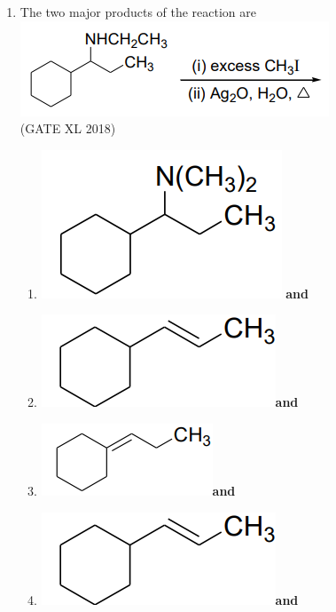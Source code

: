 \documentclass[14pt]{extarticle}
\begin{document}
\begin{flushleft}
\begin{enumerate}
\begin{enumerate}[label=(\Alph*)]
\end{enumerate}

\item The two major products of the reaction are\\ 
\includegraphics[scale=1]{fig8.png}\\
\hfill (GATE XL 2018)\\
\begin{enumerate}[label=(\Alph*)]
\item \includegraphics[scale=0.8]{fig9.png} \textbf{and} 
\item \includegraphics[scale=0.8]{fig10.png}\textbf{and} 
\item \includegraphics[scale=1]{fig11.png}\textbf{and} 
\item \includegraphics[scale=0.8]{fig10.png}\textbf{and} 
\end{enumerate}


\end{enumerate}
\end{flushleft}
\end{document}
